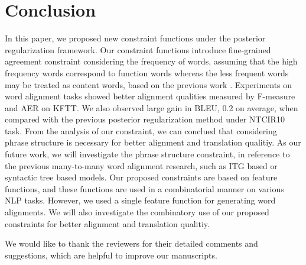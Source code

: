 \documentclass[english]{jnlp_1.4}
\begin{document}
\section{Conclusion}
\label{sec:conclusion}

In this paper, we proposed new constraint functions under the posterior regularization framework. 
Our constraint functions introduce fine-grained  agreement constraint considering the frequency of words,
assuming that the high frequency words correspond to function words whereas the less frequent words may be treated as content words, based on the previous work  \cite{setiawan2007ordering}.
Experiments on word alignment tasks showed better alignment qualities measured by F-measure and AER on KFTT.
We also observed large gain in BLEU, 0.2 on average, when compared with the previous posterior regularization method under NTCIR10 task.
From the analysis of our constraint,  we can conclued that considering phrase structure is necessary for better alignment and translation qualitiy.
As our future work, we will investigate the phrase structure constraint, in reference to the previous many-to-many word alignment research, such as ITG based \cite{P11-1064} or syntactic tree based \cite{C12-1120} models.
Our proposed constraints are based on feature functions, and these functions are used in a combinatorial manner on various NLP tasks.
However, we used a single feature function for generating word alignments.
We will also investigate the combinatory use of our proposed constraints for better alignment and translation qualitiy.


\acknowledgment
We would like to thank the reviewers for their detailed comments and suggestions, which are helpful to improve our manuscripts.
\end{document}
